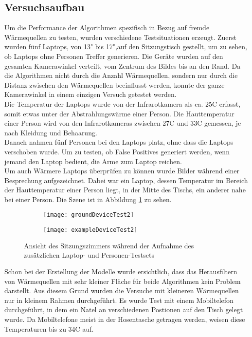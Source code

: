 \subsection{Versuchsaufbau}

Um die Performance der Algorithmen spezifisch in Bezug auf fremde Wärmequellen zu testen, wurden verschiedene Testsituationen erzeugt. Zuerst wurden fünf Laptops, von 13" bis 17",auf den Sitzungstisch gestellt, um zu sehen, ob Laptops ohne Personen Treffer generieren. Die Geräte wurden auf den gesamten Kamerawinkel verteilt, vom Zentrum des Bildes bis an den Rand. Da die Algorithmen nicht durch die Anzahl Wärmequellen, sondern nur durch die Distanz zwischen den Wärmequellen beeinflusst werden, konnte der ganze Kamerawinkel in einem einzigen Versuch getestet werden.\\
Die Temperatur der Laptops wurde von der Infrarotkamera als ca. 25\degree C erfasst, somit etwas unter der Abstrahlungswärme einer Person. Die Hauttemperatur einer Person wird von den Infrarotkameras zwischen 27\degree C und 33\degree C gemessen, je nach Kleidung und Behaarung.\\
Danach nahmen fünf Personen bei den Laptops platz,  ohne dass die Laptops verschoben wurde. Um zu testen, ob False Positives generiert werden, wenn jemand den Laptop bedient, die Arme zum Laptop reichen.\\
Um auch Wärmere Laptops überprüfen zu können wurde Bilder während einer Besprechung aufgezeichnet. Dabei war ein Laptop, dessen Temperatur im Bereich der Hauttemperatur einer Person liegt, in der Mitte des Tischs, ein anderer nahe bei einer Person. Die Szene ist in Abbildung \ref{fig:exampleDeviceTest2} zu sehen.
\\
\begin{figure}[htb]
	\centering
	\begin{subfigure}{.45\linewidth}
		\centering
		\texttt{[image: groundDeviceTest2]}
	\end{subfigure}
	\begin{subfigure}{.45\linewidth}
		\centering
		\texttt{[image: exampleDeviceTest2]}
	\end{subfigure}
	\caption{Ansicht des Sitzungszimmers während der Aufnahme des zusätzlichen Laptop- und Personen-Testsets}
	\label{fig:exampleDeviceTest2}
\end{figure}
Schon bei der Erstellung der Modelle wurde ersichtlich, dass das Herausfiltern von Wärmequellen mit sehr kleiner Fläche für beide Algorithmen kein Problem darstellt. Aus diesem Grund wurden die Versuche mit kleineren Wärmequellen nur in kleinem Rahmen durchgeführt. Es wurde Test mit einem Mobiltelefon durchgeführt, in dem ein Natel an verschiedenen Postionen auf den Tisch gelegt wurde. Da Mobiltelefone meist in der Hosentasche getragen werden, weisen diese Temperaturen bis zu 34\degree C auf.\\
\\

